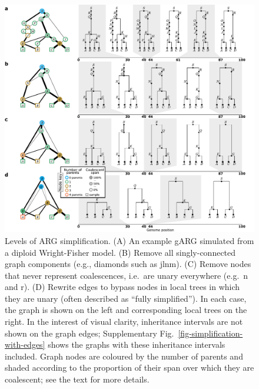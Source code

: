 \documentclass[9pt,twocolumn,twoside]{gsajnl}
\newcommand{\noderef}[1]{\textsf{#1}}
\begin{document}
\begin{figure}
\centering
\includegraphics[width=\textwidth]{illustrations/simplification}
\caption{\label{fig-simplification}
Levels of ARG simplification.
(A) An example gARG simulated from a diploid Wright-Fisher model.
(B) Remove all
singly-connected graph components (e.g., diamonds such as \noderef{jlnm}).
(C) Remove nodes that never represent coalescences,
i.e.\ are unary everywhere (e.g.\ \noderef{n} and \noderef{r}).
(D) Rewrite edges to bypass nodes in local trees in which they are unary
(often described as ``fully simplified'').
In each case, the graph is shown on the left
and corresponding local trees on the right.
In the interest of visual clarity, inheritance intervals are not shown
on the graph edges; Supplementary Fig.~\ref{fig-simplification-with-edges}
shows the graphs with these inheritance intervals included.
Graph nodes are coloured by the number of parents and shaded
according to the proportion of their span over which they are coalescent;
see the text for more details.
}
\end{figure}
\end{document}

